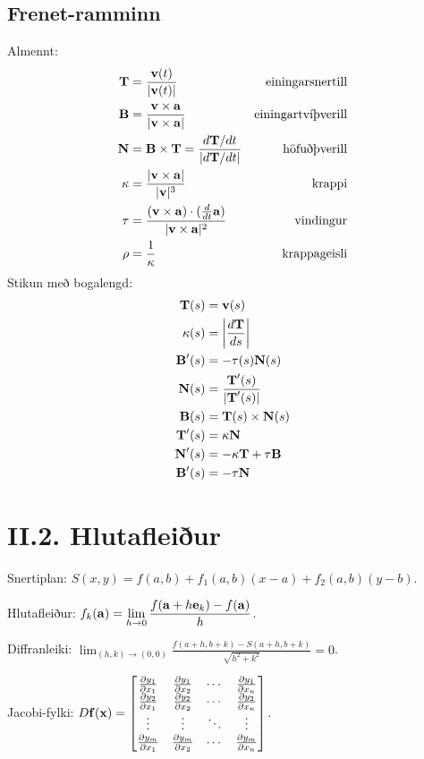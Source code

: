 \subsection*{Frenet-ramminn}
Almennt:
\begin{align*}
    \mbox{${\bf T}$} &= \frac {\mbox{${\bf v}$} (t)}{|\mbox{${\bf v}$}(t)|} & \text{einingarsnertill}\\
    \mbox{${\bf B}$} &= \frac{\mbox{${\bf v}$} \times \mbox{${\bf a}$}}{|\mbox{${\bf v}$} \times \mbox{${\bf a}$}|} & \text{einingartvíþverill}\\
    \mbox{${\bf N}$} &= \mbox{${\bf B}$} \times \mbox{${\bf T}$} = \frac {d\mbox{${\bf T}$}/dt}{|d\mbox{${\bf T}$}/dt|} & \text{höfuðþverill}\\
    \kappa &= \frac{|\mbox{${\bf v}$} \times \mbox{${\bf a}$}|}{|\mbox{${\bf v}$}|^3} & \text{krappi}\\
    \tau &= \frac{(\mbox{${\bf v}$} \times \mbox{${\bf a}$}) \cdot (\frac d{dt}\mbox{${\bf a}$})}{|\mbox{${\bf v}$}\times \mbox{${\bf a}$}|^2} & \text{vindingur}\\
    \rho &= \frac 1\kappa & \text{krappageisli}\\
\end{align*}
Stikun með bogalengd:
\begin{align*}
    \mbox{${\bf T}$}(s) &= \mbox{${\bf v}$}(s)\\
    \kappa(s) &= \left| \frac {d\mbox{${\bf T}$}}{ds}\right|\\
	\mbox{${\bf B}$}'(s) &= -\tau(s) \mbox{${\bf N}$}(s)\\
	\mbox{${\bf N}$}(s) &= \frac {\mbox{${\bf T}$}'(s)}{|\mbox{${\bf T}$}'(s)|}\\
	\mbox{${\bf B}$}(s) &= \mbox{${\bf T}$}(s) \times \mbox{${\bf N}$}(s)\\
	\mbox{${\bf T}$}'(s) &= \kappa \mbox{${\bf N}$} \\
	\mbox{${\bf N}$}'(s) &= -\kappa \mbox{${\bf T}$} + \tau \mbox{${\bf B}$}\\
	\mbox{${\bf B}$}'(s) &= -\tau \mbox{${\bf N}$}
\end{align*}
\section*{II.2. Hlutafleiður}
Snertiplan: $S(x,y) = f(a,b) + f_1(a,b)(x-a) + f_2(a,b)(y-b)$.

Hlutafleiður: $\displaystyle f_k(\mbox{${\bf a}$}) = \lim_{h\to 0} \frac{f(\mbox{${\bf a}$}+h\mbox{${\bf e}$}_k)-f(\mbox{${\bf a}$})}h$.

Diffranleiki: $\displaystyle \lim_{(h,k) \to (0,0)} \frac{f(a+h,b+k)-S(a+h,b+k)}{\sqrt{h^2+k^2}}=0$.

Jacobi-fylki: $D\mbox{${\bf f}$}(\mbox{${\bf x}$}) = \begin{bmatrix}
\frac{\partial y_1}{\partial x_1}&\frac{\partial y_1}{\partial x_2}&
\cdots&\frac{\partial y_1}{\partial x_n}\\
\frac{\partial y_2}{\partial x_1}&\frac{\partial y_2}{\partial x_2}&
\cdots&\frac{\partial y_2}{\partial x_n}\\
\vdots&\vdots&\ddots&\vdots\\
\frac{\partial y_m}{\partial x_1}&\frac{\partial y_m}{\partial x_2}&
\cdots&\frac{\partial y_m}{\partial x_n}
\end{bmatrix}$.

